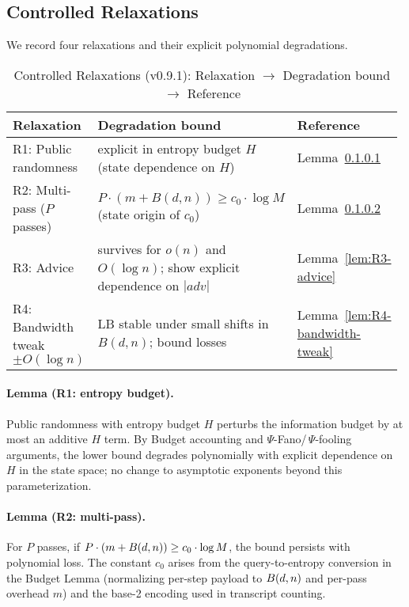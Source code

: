 \subsection{Controlled Relaxations}
We record four relaxations and their explicit polynomial degradations.

\begin{table}[t]
\centering
\begingroup
\small %
\setlength{\tabcolsep}{4.5pt} %
\renewcommand{\arraystretch}{1.05} %
\caption{Controlled Relaxations (v0.9.1): Relaxation $\to$ Degradation bound $\to$ Reference}
\begin{tabular}{@{}p{0.24\linewidth}p{0.56\linewidth}p{0.18\linewidth}@{}}
\toprule
Relaxation & Degradation bound & Reference \\
\midrule
R1: Public randomness & explicit in entropy budget $H$ (state dependence on $H$) & Lemma~\ref{lem:R1-entropy-budget} \\
R2: Multi-pass ($P$ passes) & $P\cdot(m+B(d,n)) \ge c_0\cdot \log M$ (state origin of $c_0$) & Lemma~\ref{lem:R2-multipass} \\
R3: Advice & survives for $o(n)$ and $O(\log n)$; show explicit dependence on $|adv|$ & Lemma~\ref{lem:R3-advice} \\
R4: Bandwidth tweak $\pm O(\log n)$ & LB stable under small shifts in $B(d,n)$; bound losses & Lemma~\ref{lem:R4-bandwidth-tweak} \\
\bottomrule
\end{tabular}
\endgroup
\end{table}

\paragraph{Lemma (R1: entropy budget).}\label{lem:R1-entropy-budget}
Public randomness with entropy budget $H$ perturbs the information budget by at most an additive $H$ term. By Budget accounting and $\Psi$-Fano/\,$\Psi$-fooling arguments, the lower bound degrades polynomially with explicit dependence on $H$ in the state space; no change to asymptotic exponents beyond this parameterization.

\paragraph{Lemma (R2: multi-pass).}\label{lem:R2-multipass}
For $P$ passes, if $P\cdot(m+\B(d,n)) \ge c_0\cdot \log M$, the bound persists with polynomial loss. The constant $c_0$ arises from the query-to-entropy conversion in the Budget Lemma (normalizing per-step payload to $\B(d,n)$ and per-pass overhead $m$) and the base-2 encoding used in transcript counting.


